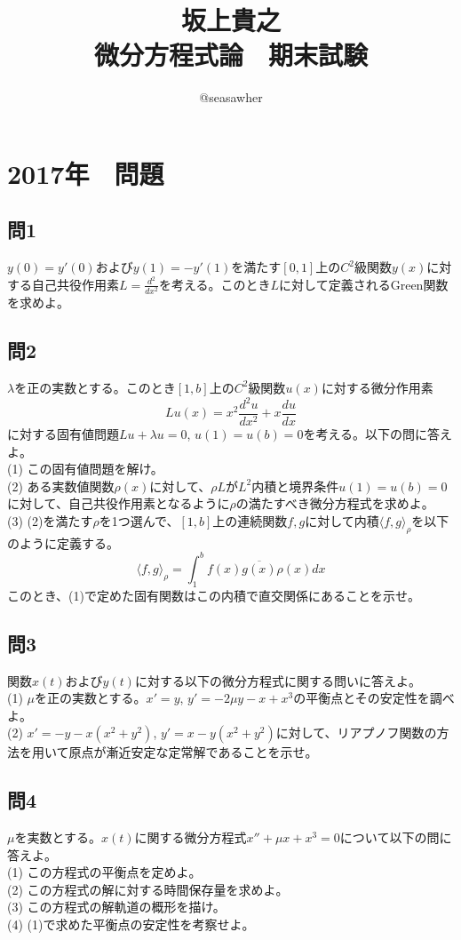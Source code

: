 \documentclass{jsarticle}
\begin{document}
\title{坂上貴之　\\ 微分方程式論　期末試験}
\author{@seasawher}
\date{}
\maketitle

\section*{2017年　問題}
\subsection*{問1}
$y(0) = y'(0)$および$y(1) = -y'(1)$を満たす$[0,1]$上の$C^2$級関数$y(x)$に対する自己共役作用素$L = \frac{d^2}{dx^2}$を考える。このとき$L$に対して定義されるGreen関数を求めよ。

\subsection*{問2}
$\lambda$を正の実数とする。このとき$[1,b]$上の$C^2$級関数$u(x)$に対する微分作用素
$$
Lu(x) =x^2 \frac{d^2u}{dx^2}+x \frac{du}{dx}
$$
に対する固有値問題$Lu + \lambda u = 0$, $u(1)=u(b)=0$を考える。以下の問に答えよ。\\
(1) この固有値問題を解け。\\
(2) ある実数値関数$\rho(x)$に対して、$\rho L$が$L^2$内積と境界条件$u(1)=u(b)=0$に対して、自己共役作用素となるように$\rho$の満たすべき微分方程式を求めよ。\\
(3) (2)を満たす$\rho$を1つ選んで、$[1,b]$上の連続関数$f,g$に対して内積$\langle f,g \rangle_{\rho}$を以下のように定義する。
$$
\langle f, g\rangle_{\rho}=\int_1^b f(x)\overline{g(x)}\rho(x)dx
$$
このとき、(1)で定めた固有関数はこの内積で直交関係にあることを示せ。

\subsection*{問3}
関数$x(t)$および$y(t)$に対する以下の微分方程式に関する問いに答えよ。\\
(1) $\mu$を正の実数とする。$x' = y$, $y'=-2\mu y -x +x^3$の平衡点とその安定性を調べよ。\\
(2) $x' =-y -x(x^2+y^2)$, $y'=x-y(x^2+y^2)$に対して、リアプノフ関数の方法を用いて原点が漸近安定な定常解であることを示せ。

\subsection*{問4}
$\mu$を実数とする。$x(t)$に関する微分方程式$x''+\mu x +x^3=0$について以下の問に答えよ。\\
(1) この方程式の平衡点を定めよ。\\
(2) この方程式の解に対する時間保存量を求めよ。\\
(3) この方程式の解軌道の概形を描け。\\
(4) (1)で求めた平衡点の安定性を考察せよ。
\end{document}
